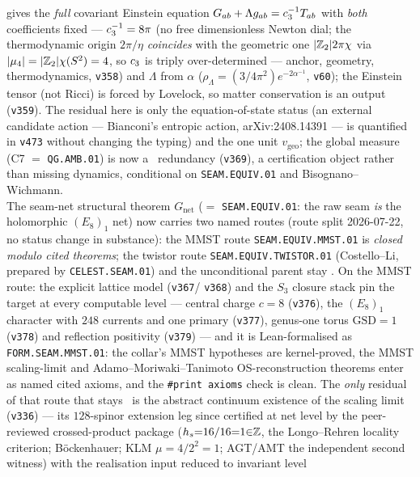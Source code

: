 \begin{keyboxnb}
gives the \emph{full} covariant Einstein equation $G_{ab}+\Lambda g_{ab}=c_3^{-1}T_{ab}$ with \emph{both}
coefficients fixed --- $c_3^{-1}=8\pi$ (no free dimensionless Newton dial; the thermodynamic origin $2\pi/\eta$
\emph{coincides} with the geometric one $|\mathbb{Z}_2|2\pi\chi$ via $|\mu_4|=|\mathbb{Z}_2|\chi(S^2)=4$, so $c_3$ is triply
over-determined --- anchor, geometry, thermodynamics, \texttt{v358}) and $\Lambda$ from $\alpha$ ($\rho_\Lambda
=(3/4\pi^2)e^{-2\alpha^{-1}}$, \texttt{v60}); the Einstein tensor (not Ricci) is forced by Lovelock, so matter
conservation is an output (\texttt{v359}). The residual here is only the equation-of-state status (an external
candidate action --- Bianconi's entropic action, arXiv:2408.14391 --- is quantified in \texttt{v473} without
changing the typing) and the one unit
$v_{\mathrm{geo}}$; the global measure (C7 $=$ \texttt{QG.AMB.01}) is now a \mC\ redundancy (\texttt{v369}), a
certification object rather than missing dynamics, conditional on \texttt{SEAM.EQUIV.01} and Bisognano--Wichmann.
\smallskip\\
\noindent The seam-net structural theorem $G_{\mathrm{net}}$ ($=$ \texttt{SEAM.EQUIV.01}: the raw seam \emph{is} the
holomorphic $(E_8)_1$ net) now carries two named routes (route split 2026-07-22, no status change in substance):
the MMST route \texttt{SEAM.EQUIV.MMST.01} is \emph{closed modulo cited theorems}; the twistor route
\texttt{SEAM.EQUIV.TWISTOR.01} (Costello--Li, prepared by \texttt{CELEST.SEAM.01}) and the unconditional parent
stay \mO. On the MMST route: the explicit lattice model (\texttt{v367}/%
\texttt{v368}) and the $S_3$ closure stack pin the target at every computable level --- central charge $c=8$
(\texttt{v376}), the $(E_8)_1$ character with $248$ currents and one primary (\texttt{v377}), genus-one torus
$\mathrm{GSD}=1$ (\texttt{v378}) and reflection positivity (\texttt{v379}) --- and it is Lean-formalised as
\texttt{FORM.SEAM.MMST.01}: the collar's MMST hypotheses are kernel-proved, the MMST scaling-limit and
Adamo--Moriwaki--Tanimoto OS-reconstruction theorems enter as named cited axioms, and the \texttt{\#print axioms}
check is clean. The \emph{only} residual of that route that stays \mO\ is the abstract continuum existence of the
scaling limit
(\texttt{v336}) --- its $128$-spinor extension leg since certified at net level by the peer-reviewed
crossed-product package ($h_s{=}16/16{=}1{\in}\mathbb{Z}$, the Longo--Rehren locality criterion; B\"ockenhauer; KLM
$\mu{=}4/2^2{=}1$; AGT/AMT the independent second witness) with the realisation input reduced to invariant level

\end{keyboxnb}
